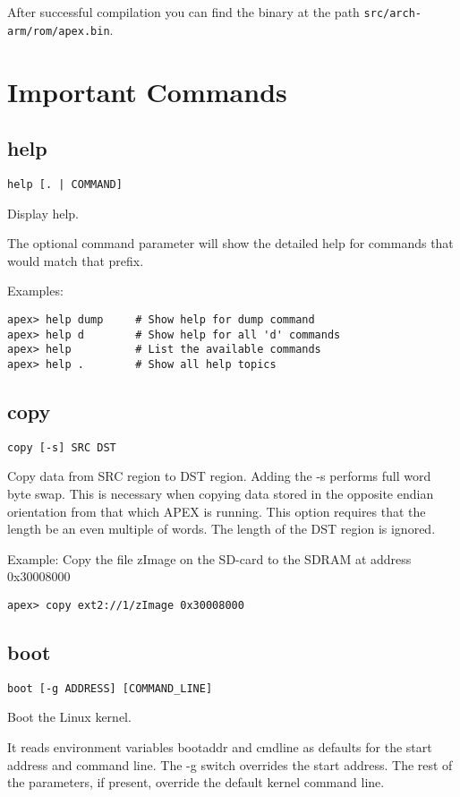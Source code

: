 After successful compilation you can find the binary at the path \texttt{src/arch-arm/rom/apex.bin}.

\section{Important Commands}

\subsection{help}
\texttt{help [. | COMMAND]}

Display help. 

The optional command parameter will show the detailed help for commands that
would match that prefix. 

Examples:
\begin{lstlisting}
apex> help dump     # Show help for dump command 
apex> help d        # Show help for all 'd' commands 
apex> help          # List the available commands 
apex> help .        # Show all help topics
\end{lstlisting}

\subsection{copy}
\texttt{copy [-s] SRC DST}

Copy data from SRC region to DST region. Adding the -s performs full word byte
swap. This is necessary when copying data stored in the opposite endian
orientation from that which APEX is running. This option requires that the
length be an even multiple of words. The length of the DST region is ignored. 

Example: Copy the file zImage on the SD-card to the SDRAM at address 0x30008000
\begin{lstlisting}
apex> copy ext2://1/zImage 0x30008000
\end{lstlisting}

\subsection{boot}
\texttt{boot [-g ADDRESS] [COMMAND\_LINE]}

Boot the Linux kernel.

It reads environment variables bootaddr and cmdline as defaults for the start
address and command line. The -g switch overrides the start address. The rest
of the parameters, if present, override the default kernel command line. 

